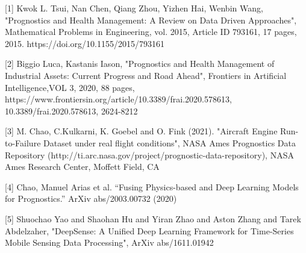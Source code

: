 \documentclass[a4paper,12pt]{article}
\begin{document}
\medskip
\small
[1] Kwok L. Tsui, Nan Chen, Qiang Zhou, Yizhen Hai, Wenbin Wang, "Prognostics and Health Management: A Review on Data Driven Approaches", Mathematical Problems in Engineering, vol. 2015, Article ID 793161, 17 pages, 2015. https://doi.org/10.1155/2015/793161

[2] Biggio Luca, Kastanis Iason, "Prognostics and Health Management of Industrial Assets: Current Progress and Road Ahead", Frontiers in Artificial Intelligence,VOL 3, 2020, 88 pages, https://www.frontiersin.org/article/10.3389/frai.2020.578613, 10.3389/frai.2020.578613, 2624-8212

[3] M. Chao, C.Kulkarni, K. Goebel and O. Fink (2021). "Aircraft Engine Run-to-Failure Dataset under real flight conditions", NASA Ames Prognostics Data Repository (http://ti.arc.nasa.gov/project/prognostic-data-repository), NASA Ames Research Center, Moffett Field, CA

[4] Chao, Manuel Arias et al. “Fusing Physics-based and Deep Learning Models for Prognostics.” ArXiv abs/2003.00732 (2020)

[5] Shuochao Yao and Shaohan Hu and Yiran Zhao and Aston Zhang and Tarek Abdelzaher, "DeepSense: A Unified Deep Learning Framework for Time-Series Mobile Sensing Data Processing", ArXiv abs/1611.01942









\end{document}
